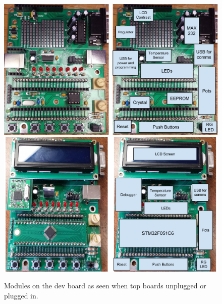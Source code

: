 \begin{figure}
  \centering
  \includegraphics[width=\textwidth]{./fig/dev_board_unplugged.pdf}\\
  \vspace{3mm}
  \includegraphics[width=\textwidth]{./fig/dev_board_plugged_in.pdf}
  \caption{Modules on the dev board as seen when top boards unplugged or plugged in.}
\end{figure}

